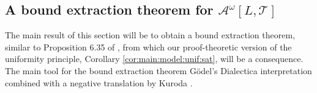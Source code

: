 \documentclass[11pt]{amsart}
\theoremstyle{definition}
\theoremstyle{remark}
\begin{document}
\subsection{A bound extraction theorem for $\mathcal{A}^\omega[L,\mathcal{T}]$}
The main result of this section will be to obtain a bound extraction theorem, similar to Proposition 6.35 of \cite{GuK2016}, from which our proof-theoretic version of the uniformity principle, Corollary \ref{cor:main:model:unif:sat}, will be a consequence. The main tool for the bound extraction theorem G\"odel's Dialectica interpretation \cite{Goe1958} combined with a negative translation by Kuroda \cite{Kur1951}.
\end{document}
